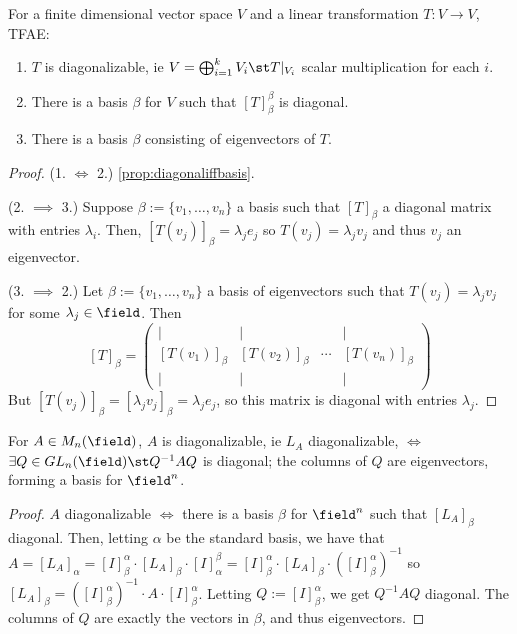 \begin{proposition}
    For a finite dimensional vector space $V$ and a linear transformation $T : V \to V$, TFAE:
    \begin{enumerate}
        \item $T$ is diagonalizable, ie $V = \bigoplus_{i=1}^k V_i \st T\vert_{V_i}$ scalar multiplication for each $i$.
        \item There is a basis $\beta$ for $V$ such that $[T]_\beta^\beta$ is diagonal.
        \item There is a basis $\beta$ consisting of eigenvectors of $T$.
    \end{enumerate}    
\end{proposition}

\begin{proof}
    (1. $\iff$ 2.) \cref{prop:diagonaliffbasis}.


    (2. $\implies$ 3.) Suppose $\beta :=\{v_1, \dots, v_n\}$ a basis such that $[T]_\beta$ a diagonal matrix with entries $\lambda_i$. Then, $[T(v_j)]_\beta = \lambda_j e_j$ so $T(v_j) = \lambda_j v_j$ and thus $v_j$ an eigenvector.

    (3. $\implies$ 2.) Let $\beta :=\{v_1, \dots, v_n\}$ a basis of eigenvectors such that $T(v_j) = \lambda_j v_j$ for some $\lambda_j \in \field$. Then \[
    [T]_\beta = \begin{pmatrix}
        \vert & \vert & & \vert\\
        [T(v_1)]_\beta & [T(v_2)]_\beta & \cdots & [T(v_n)]_\beta \\
        \vert & \vert & & \vert
    \end{pmatrix}
    \]
    But $[T(v_j)]_\beta = [\lambda_j v_j]_\beta = \lambda_j e_j$, so this matrix is diagonal with entries $\lambda_{j}$.
\end{proof}

\begin{proposition}
    For $A \in M_n(\field)$, $A$ is diagonalizable, ie $L_A$ diagonalizable, $\iff$ $\exists Q \in GL_n(\field) \st Q^{-1}A Q$ is diagonal; the columns of $Q$ are eigenvectors, forming a basis for $\field^n$.
\end{proposition}

\begin{proof}
    $A$ diagonalizable $\iff$ there is a basis $\beta$ for $\field^n$ such that $[L_A]_\beta$ diagonal. Then, letting $\alpha$ be the standard basis, we have that $A = [L_A]_\alpha = [I]_\beta^\alpha \cdot [L_A]_\beta \cdot [I]_\alpha^\beta = [I]_\beta^\alpha \cdot [L_A]_\beta \cdot ([I]_\beta^\alpha)^{-1}$ so $[L_A]_\beta = ([I]_\beta^\alpha)^{-1} \cdot A \cdot [I]_\beta^\alpha$. Letting $Q := [I]_\beta^\alpha$, we get $Q^{-1}A Q$ diagonal. The columns of $Q$ are exactly the vectors in $\beta$, and thus eigenvectors.
\end{proof}

